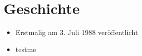 
\chapter{Geschichte}


  \begin{itemize}
  \item Erstmalig am 3. Juli 1988 veröffentlicht
  \end{itemize}



  \begin{itemize}
  \item testme
  \end{itemize}


